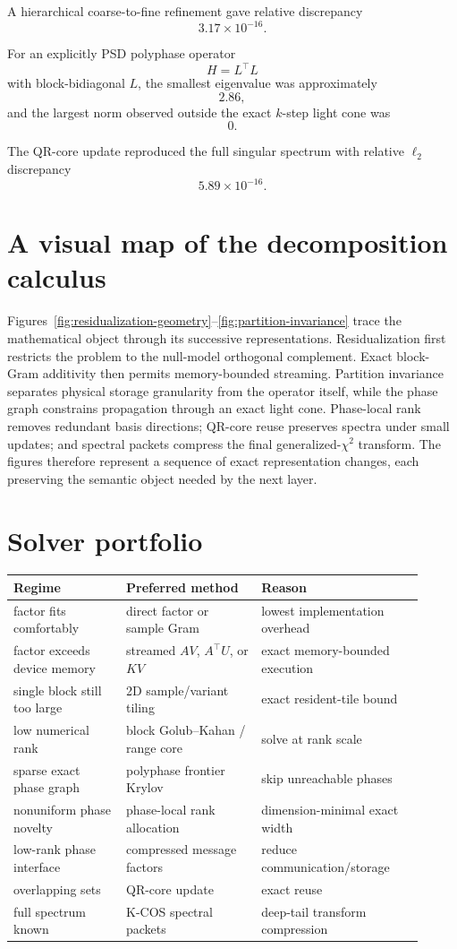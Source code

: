 \documentclass[11pt]{article}
\theoremstyle{definition}
\theoremstyle{remark}
\begin{document}
A hierarchical coarse-to-fine refinement gave relative discrepancy
\[
3.17\times10^{-16}.
\]

For an explicitly PSD polyphase operator
\[
H=L^\top L
\]
with block-bidiagonal \(L\), the smallest eigenvalue was approximately
\[
2.86,
\]
and the largest norm observed outside the exact \(k\)-step light cone was
\[
\boxed{0}.
\]

The QR-core update reproduced the full singular spectrum with relative
\(\ell_2\) discrepancy
\[
5.89\times10^{-16}.
\]


\section{A visual map of the decomposition calculus}

Figures~\ref{fig:residualization-geometry}--\ref{fig:partition-invariance} trace the mathematical object through its successive representations. Residualization first restricts the problem to the null-model orthogonal complement. Exact block-Gram additivity then permits memory-bounded streaming. Partition invariance separates physical storage granularity from the operator itself, while the phase graph constrains propagation through an exact light cone. Phase-local rank removes redundant basis directions; QR-core reuse preserves spectra under small updates; and spectral packets compress the final generalized-$\chi^2$ transform. The figures therefore represent a sequence of exact representation changes, each preserving the semantic object needed by the next layer.

\section{Solver portfolio}

\begin{longtable}{p{0.25\linewidth}p{0.30\linewidth}p{0.36\linewidth}}
\toprule
Regime & Preferred method & Reason\\
\midrule
factor fits comfortably & direct factor or sample Gram & lowest implementation overhead\\
factor exceeds device memory & streamed \(AV\), \(A^\top U\), or \(KV\) & exact memory-bounded execution\\
single block still too large & 2D sample/variant tiling & exact resident-tile bound\\
low numerical rank & block Golub--Kahan / range core & solve at rank scale\\
sparse exact phase graph & polyphase frontier Krylov & skip unreachable phases\\
nonuniform phase novelty & phase-local rank allocation & dimension-minimal exact width\\
low-rank phase interface & compressed message factors & reduce communication/storage\\
overlapping sets & QR-core update & exact reuse\\
full spectrum known & K-COS spectral packets & deep-tail transform compression\\
\bottomrule
\end{longtable}
\end{document}
